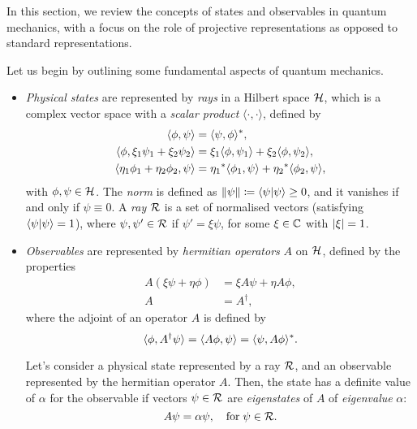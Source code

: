 In this section, we review the concepts of states and observables in quantum mechanics, with a focus on the role of projective representations as opposed to standard representations.

Let us begin by outlining some fundamental aspects of quantum mechanics.
\begin{itemize}
    \item \emph{Physical states} are represented by \emph{rays} in a Hilbert space $\mathcal{H}$, which is a complex vector space with a \emph{scalar product} $\langle \cdot, \cdot \rangle$, defined by
    \begin{subequations}
        \begin{align}
        \langle \phi, \psi \rangle &= \langle \psi, \phi \rangle^* , \\
        \langle \phi, \xi_1 \psi_1 + \xi_2 \psi_2 \rangle &= \xi_1 \langle \phi, \psi_1 \rangle + \xi_2 \langle \phi, \psi_2 \rangle ,\\
        \langle \eta_1 \phi_1 + \eta_2 \phi_2, \psi \rangle &= {\eta_1}^* \langle \phi_1, \psi \rangle + {\eta_2}^* \langle \phi_2, \psi \rangle ,
        \end{align}
        \end{subequations}
    with $\phi,\psi \in \mathcal{H}$. The \emph{norm} is defined as $\lVert\psi\rVert \coloneq \braket{\psi}{\psi} \geq 0$, and it vanishes if and only if $\psi \equiv 0$. A \emph{ray} $\mathcal{R}$ is a set of normalised vectors (satisfying $\braket{\psi}{\psi} = 1$), where $\psi, \psi' \in \mathcal{R}$ if $\psi' = \xi \psi$, for some $\xi \in \mathbb{C}$ with $\abs{\xi} = 1$.
    \item \emph{Observables} are represented by \emph{hermitian operators} $A$ on $\mathcal{H}$, defined by the properties
    \begin{subequations}
    \begin{align}
        A (\xi \psi + \eta \phi) &= \xi A\psi + \eta A \phi ,\\
        A &= A^\dagger ,
    \end{align}
    \end{subequations}
    where the adjoint of an operator $A$ is defined by
    \begin{equation}\label{eq:def-adjoint}
        \langle \phi, A^\dagger \psi \rangle = \langle A\phi, \psi \rangle = \langle \psi, A\phi \rangle^* .
    \end{equation}

    Let's consider a physical state represented by a ray $\mathcal{R}$, and an observable represented by the hermitian operator $A$. Then, the state has a definite value of $\alpha$ for the observable if vectors $\psi \in \mathcal{R}$ are \emph{eigenstates} of $A$ of \emph{eigenvalue} $\alpha$:
    \begin{equation}
        A\psi = \alpha \psi, \quad \textup{for} \; \psi \in \mathcal{R} .
    \end{equation}


\end{itemize}
